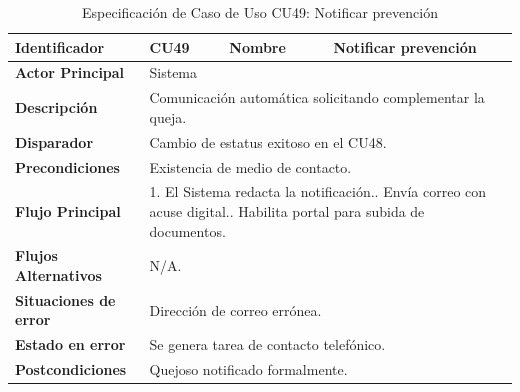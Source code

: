 \begingroup
\setlength{\parskip}{0pt}
\begin{longtable}{|p{3.5cm}|p{2cm}|p{2.5cm}|p{7cm}|}
\caption{Especificación de Caso de Uso CU49: Notificar prevención}
\label{tab:cu49} \\
\hline
\textbf{Identificador} & CU49 & \textbf{Nombre} & Notificar prevención \\ \hline
\textbf{Actor Principal} & \multicolumn{3}{p{11.5cm}|}{Sistema} \\ \hline
\textbf{Descripción} & \multicolumn{3}{p{11.5cm}|}{Comunicación automática solicitando complementar la queja.} \\ \hline
\textbf{Disparador} & \multicolumn{3}{p{11.5cm}|}{Cambio de estatus exitoso en el CU48.} \\ \hline
\textbf{Precondiciones} & \multicolumn{3}{p{11.5cm}|}{Existencia de medio de contacto.} \\ \hline
\textbf{Flujo Principal} & \multicolumn{3}{p{11.5cm}|}{1. El Sistema redacta la notificación.\newline 2. Envía correo con acuse digital.\newline 3. Habilita portal para subida de documentos.} \\ \hline
\textbf{Flujos Alternativos} & \multicolumn{3}{p{11.5cm}|}{N/A.} \\ \hline
\textbf{Situaciones de error} & \multicolumn{3}{p{11.5cm}|}{Dirección de correo errónea.} \\ \hline
\textbf{Estado en error} & \multicolumn{3}{p{11.5cm}|}{Se genera tarea de contacto telefónico.} \\ \hline
\textbf{Postcondiciones} & \multicolumn{3}{p{11.5cm}|}{Quejoso notificado formalmente.} \\ \hline
\end{longtable}
\endgroup

\vspace{0.8cm}

